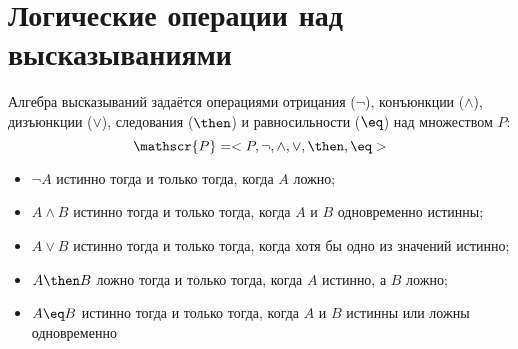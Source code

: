 \section{Логические операции над высказываниями}
Алгебра высказываний задаётся операциями отрицания ($\lnot$), конъюнкции ($\land$), дизъюнкции ($\lor$), следования ($\then$) и равносильности ($\eq$) над множеством $P$:
\begin{equation}
    \mathscr{P} = <P, \lnot, \land, \lor, \then, \eq>
\end{equation}

\begin{itemize}
    \item $\lnot A$ истинно тогда и только тогда, когда $A$ ложно;
    \item $A \land B$ истинно тогда и только тогда, когда $A$ и $B$ одновременно истинны;
    \item $A \lor B$ истинно тогда и только тогда, когда хотя бы одно из значений истинно;
    \item $A \then B$ ложно тогда и только тогда, когда $A$ истинно, а $B$ ложно;
    \item $A \eq B$ истинно тогда и только тогда, когда $A$ и $B$ истинны или ложны одновременно
\end{itemize}